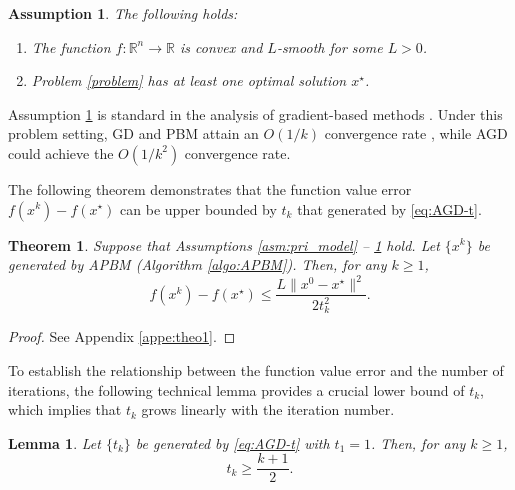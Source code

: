 \documentclass[letterpaper, 10 pt, conference]{ieeeconf}  %
\newtheorem{assumption}{Assumption}  %
\newtheorem{theorem}{Theorem}  %
\newtheorem{lemma}{Lemma}  %
\begin{document}
\begin{assumption}\label{asm:prob}
The following holds:
     \begin{enumerate}[label=(\alph*)]
     \item The function $f: \mathbb{R}^n \rightarrow \mathbb{R}$ is convex and $L$-smooth for some $L>0$.
     \item Problem \eqref{problem} has at least one optimal solution $x^\star$.
    \end{enumerate}
\end{assumption}




Assumption \ref{asm:prob} is standard in the analysis of gradient-based methods \cite{boyd2004convex,Beck09FISTA,liao2025accelerated}. Under this problem setting, GD and PBM attain an $O(1/k)$ convergence rate \cite{boyd2004convex,Nesterov2021memory,diaz2023optimal}, while AGD could achieve the $O(1/k^2)$ convergence rate.

The following theorem demonstrates that the function value error $f(x^k)-f(x^\star)$ can be upper bounded by $t_k$ that generated by \eqref{eq:AGD-t}. 

\begin{theorem}\label{theo:sublinear}
     Suppose that Assumptions \ref{asm:pri_model} -- \ref{asm:prob}  hold. Let $\{x^k\}$ be generated by APBM (Algorithm \ref{algo:APBM}). Then, for any $k\geq 1$,
     \begin{equation}\label{eq:result-tk}
         f(x^{k}) -f(x^\star) \leq \frac{L\|x^0-x^\star\|^2}{2t_{k}^2}.
     \end{equation}
\end{theorem}

\begin{proof}
    See Appendix \ref{appe:theo1}.
\end{proof}


To establish the relationship between the function value error and the number of iterations, the following technical lemma provides a crucial lower bound of $t_k$, which implies that $t_k$ grows linearly with the iteration number. 
\begin{lemma}{\cite[Lemma 4.3]{Beck09FISTA}}\label{lem:tk}
    Let $\{t_k\}$ be generated by \eqref{eq:AGD-t} with $t_1 =1$. Then, for any $ k\geq1$, 
    \begin{equation}\label{eq:tk_geq_k+1}
        t_k \geq \frac{k+1}{2}.
    \end{equation}
\end{lemma}
\end{document}
